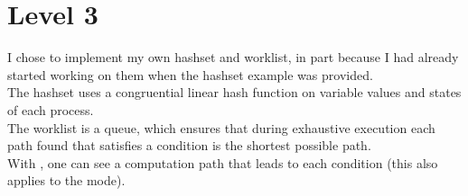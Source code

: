 \section{Level 3}

I chose to implement my own hashset and worklist, in part because I had
already started working on them when the hashset example was provided.\\
The hashset uses a congruential linear hash function on variable values and
states of each process.\\

The worklist is a queue, which ensures that during exhaustive execution each
path found that satisfies a condition is the shortest possible path.\\

With , one can see a computation path that leads to each condition
(this also applies to the  mode).


